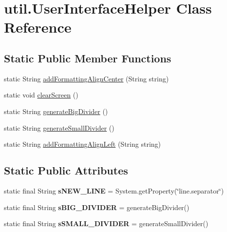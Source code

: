 \hypertarget{classutil_1_1_user_interface_helper}{
\section{util.\-User\-Interface\-Helper \-Class \-Reference}
\label{classutil_1_1_user_interface_helper}
}
\subsection*{\-Static \-Public \-Member \-Functions}
\begin{DoxyCompactItemize}
\item 
static \-String \hyperlink{classutil_1_1_user_interface_helper_acf3d9a8a6c23164b5c0c6682ec62d8be}{add\-Formatting\-Align\-Center} (\-String string)
\item 
static void \hyperlink{classutil_1_1_user_interface_helper_ae3d675fed7d74d3d43a79ce8fc9ccb39}{clear\-Screen} ()
\item 
static \-String \hyperlink{classutil_1_1_user_interface_helper_af17b1430faca0b9c901f7cc9d17472fd}{generate\-Big\-Divider} ()
\item 
static \-String \hyperlink{classutil_1_1_user_interface_helper_a924fb6c7dde65895865a161d0c805fdc}{generate\-Small\-Divider} ()
\item 
static \-String \hyperlink{classutil_1_1_user_interface_helper_aff9a1b8300f95974b252755c6139d239}{add\-Formatting\-Align\-Left} (\-String string)
\end{DoxyCompactItemize}
\subsection*{\-Static \-Public \-Attributes}
\begin{DoxyCompactItemize}
\item 
\hypertarget{classutil_1_1_user_interface_helper_a231aba8c8cc137f8cf4b8375bc297112}{
static final \-String {\bfseries s\-N\-E\-W\-\_\-\-L\-I\-N\-E} = \-System.\-get\-Property(\char`\"{}line.\-separator\char`\"{})}
\label{classutil_1_1_user_interface_helper_a231aba8c8cc137f8cf4b8375bc297112}

\item 
\hypertarget{classutil_1_1_user_interface_helper_a97046241adbbd3b92dfc5b3b39b02e44}{
static final \-String {\bfseries s\-B\-I\-G\-\_\-\-D\-I\-V\-I\-D\-E\-R} = generate\-Big\-Divider()}
\label{classutil_1_1_user_interface_helper_a97046241adbbd3b92dfc5b3b39b02e44}

\item 
\hypertarget{classutil_1_1_user_interface_helper_a884209489a2717e546f17cb1627005ac}{
static final \-String {\bfseries s\-S\-M\-A\-L\-L\-\_\-\-D\-I\-V\-I\-D\-E\-R} = generate\-Small\-Divider()}
\label{classutil_1_1_user_interface_helper_a884209489a2717e546f17cb1627005ac}

\end{DoxyCompactItemize}
